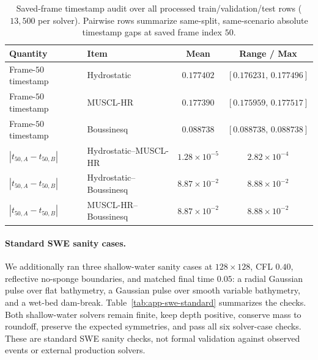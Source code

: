 \begin{table}[H]
\centering
\caption{Saved-frame timestamp audit over all processed train/validation/test rows ($13{,}500$ per solver). Pairwise rows summarize same-split, same-scenario absolute timestamp gaps at saved frame index $50$.}
\label{tab:app-timestamp-audit}
\small
\begin{tabular}{llcc}
    \toprule
    Quantity & Item & Mean & Range / Max \\
    \midrule
    Frame-$50$ timestamp & Hydrostatic & $0.177402$ & $[0.176231,\, 0.177496]$ \\
    Frame-$50$ timestamp & MUSCL-HR    & $0.177390$ & $[0.175959,\, 0.177517]$ \\
    Frame-$50$ timestamp & Boussinesq  & $0.088738$ & $[0.088738,\, 0.088738]$ \\
    \midrule
    $|t_{50, A} - t_{50, B}|$ & Hydrostatic--MUSCL-HR   & $1.28 \times 10 ^ {-5}$ & $2.82 \times 10 ^ {-4}$ \\
    $|t_{50, A} - t_{50, B}|$ & Hydrostatic--Boussinesq & $8.87 \times 10 ^ {-2}$ & $8.88 \times 10 ^ {-2}$ \\
    $|t_{50, A} - t_{50, B}|$ & MUSCL-HR--Boussinesq    & $8.87 \times 10 ^ {-2}$ & $8.88 \times 10 ^ {-2}$ \\
    \bottomrule
\end{tabular}
\end{table}

\paragraph{Standard SWE sanity cases.}
We additionally ran three shallow-water sanity cases at $128 \times 128$, CFL $0.40$, reflective no-sponge boundaries, and matched final time $0.05$: a radial Gaussian pulse over flat bathymetry, a Gaussian pulse over smooth variable bathymetry, and a wet-bed dam-break. Table~\ref{tab:app-swe-standard} summarizes the checks. Both shallow-water solvers remain finite, keep depth positive, conserve mass to roundoff, preserve the expected symmetries, and pass all six solver-case checks. These are standard SWE sanity checks, not formal validation against observed events or external production solvers.

